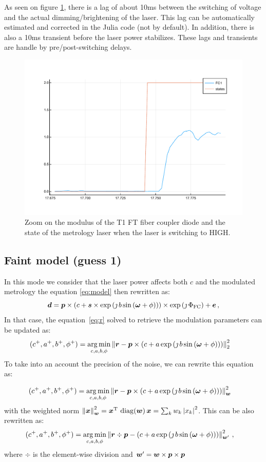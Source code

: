 \documentclass[a4paper,11pt,twoside]{scrartcl}
\begin{document}
As seen on figure \ref{fig:faintzoom}, there is a lag of about 10ms between the switching of voltage and the actual dimming/brightening of the laser. This lag can be automatically estimated and corrected in the Julia code (not by default). In addition, there is also a 10ms transient before the laser power stabilizes. These lags and transients are handle by pre/post-switching delays.
\begin{figure}
    \centering
    \includegraphics[width=0.6\linewidth]{figs/FaintStatesZoom.pdf}
    \caption{Zoom on the modulus of the T1 FT fiber coupler diode and the state of the metrology laser when the laser is switching to HIGH.}
    \label{fig:faintzoom}
\end{figure}

\subsection{Faint model (guess 1)}
In this mode we consider that the laser power affects both  $c$ and the modulated metrology the equation \ref{eq:model} then rewritten as:
\begin{equation}
    \boldsymbol{d} =  \boldsymbol{p} \times  \left( c +\boldsymbol{s} \times  \exp\left( \jmath \, b \sin\left( \boldsymbol{\omega} + \phi\right)\right)\right)\times\exp\left(\jmath\,\Phi_\textrm{FC}\right)+  \boldsymbol{e}\,,\label{eq:modelfaint}
\end{equation}
In that case, the equation~\ref{eq:r} solved to retrieve the modulation parameters can be updated   as:
\begin{align}
    (c^+, a^+, b^+, \phi^+) &= \argmin_{c,a,b,\phi} \Norm{\V{r} -  \V{p} \times\left(c +  a \exp\left( \jmath \, b \sin\left( \V{\omega} + \phi\right)\right)\right) }_2^2
\end{align}
To take into an account the precision of the noise, we can rewrite this equation as:

\begin{align}
    (c^+, a^+, b^+, \phi^+) &= \argmin_{c,a,b,\phi} \Norm{\V{r} -  \V{p} \times\left(c +  a \exp\left( \jmath \, b \sin\left( \V{\omega} + \phi\right)\right)\right) }_{\V{w}}^2
\end{align}
with the weighted norm $\Norm{\V x}_{\V w}^2 = \V x\T \,\diag(\V w)\, \V x = \sum_k w_k \Abs{x_k}^2$. This can be also rewritten as:
\begin{align}
    (c^+, a^+, b^+, \phi^+) &= \argmin_{c,a,b,\phi} \Norm{\V{r} \div \V{p}  - \left(c +  a \exp\left( \jmath \, b \sin\left( \V{\omega} + \phi\right)\right)\right) }_{\V w'}^2\label{eq:rfaint}\,,
\end{align}
where $\div$ is the element-wise division and  $   \boldsymbol{w}' =  \boldsymbol{w} \times \boldsymbol{p} \times \boldsymbol{p}$
\end{document}
